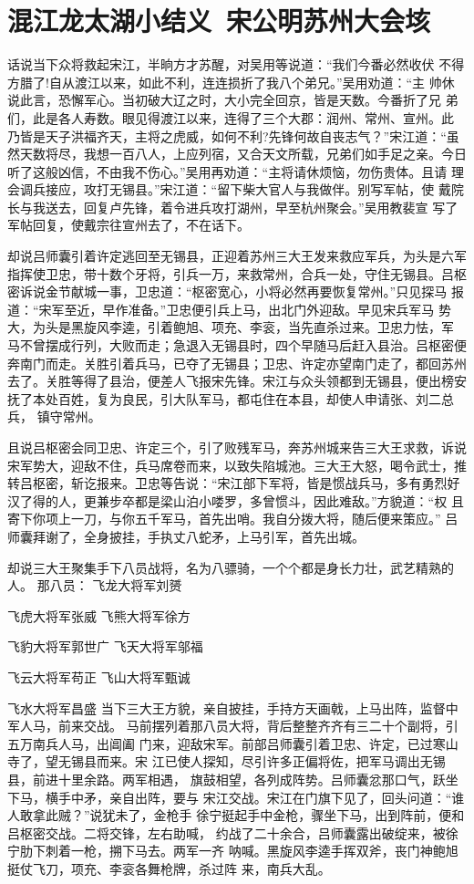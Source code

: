 \chapter{混江龙太湖小结义~宋公明苏州大会垓}

话说当下众将救起宋江，半晌方才苏醒，对吴用等说道：“我们今番必然收伏
不得方腊了!自从渡江以来，如此不利，连连损折了我八个弟兄。”吴用劝道：“主
帅休说此言，恐懈军心。当初破大辽之时，大小完全回京，皆是天数。今番折了兄
弟们，此是各人寿数。眼见得渡江以来，连得了三个大郡：润州、常州、宣州。此
乃皆是天子洪福齐天，主将之虎威，如何不利?先锋何故自丧志气？”宋江道：“虽
然天数将尽，我想一百八人，上应列宿，又合天文所载，兄弟们如手足之亲。今日
听了这般凶信，不由我不伤心。”吴用再劝道：“主将请休烦恼，勿伤贵体。且请
理会调兵接应，攻打无锡县。”宋江道：“留下柴大官人与我做伴。别写军帖，使
戴院长与我送去，回复卢先锋，着令进兵攻打湖州，早至杭州聚会。”吴用教裴宣
写了军帖回复，使戴宗往宣州去了，不在话下。

却说吕师囊引着许定逃回至无锡县，正迎着苏州三大王发来救应军兵，为头是六军
指挥使卫忠，带十数个牙将，引兵一万，来救常州，合兵一处，守住无锡县。吕枢
密诉说金节献城一事，卫忠道：“枢密宽心，小将必然再要恢复常州。”只见探马
报道：“宋军至近，早作准备。”卫忠便引兵上马，出北门外迎敌。早见宋兵军马
势大，为头是黑旋风李逵，引着鲍旭、项充、李衮，当先直杀过来。卫忠力怯，军
马不曾摆成行列，大败而走；急退入无锡县时，四个早随马后赶入县治。吕枢密便
奔南门而走。关胜引着兵马，已夺了无锡县；卫忠、许定亦望南门走了，都回苏州
去了。关胜等得了县治，便差人飞报宋先锋。宋江与众头领都到无锡县，便出榜安
抚了本处百姓，复为良民，引大队军马，都屯住在本县，却使人申请张、刘二总兵，
镇守常州。

且说吕枢密会同卫忠、许定三个，引了败残军马，奔苏州城来告三大王求救，诉说
宋军势大，迎敌不住，兵马席卷而来，以致失陷城池。三大王大怒，喝令武士，推
转吕枢密，斩讫报来。卫忠等告说：“宋江部下军将，皆是惯战兵马，多有勇烈好
汉了得的人，更兼步卒都是梁山泊小喽罗，多曾惯斗，因此难敌。”方貌道：“权
且寄下你项上一刀，与你五千军马，首先出哨。我自分拨大将，随后便来策应。”
吕师囊拜谢了，全身披挂，手执丈八蛇矛，上马引军，首先出城。

却说三大王聚集手下八员战将，名为八骠骑，一个个都是身长力壮，武艺精熟的人。
那八员：
飞龙大将军刘赟

飞虎大将军张威
飞熊大将军徐方

飞豹大将军郭世广
飞天大将军邬福

飞云大将军苟正
飞山大将军甄诚

飞水大将军昌盛
当下三大王方貌，亲自披挂，手持方天画戟，上马出阵，监督中军人马，前来交战。
马前摆列着那八员大将，背后整整齐齐有三二十个副将，引五万南兵人马，出阊阖
门来，迎敌宋军。前部吕师囊引着卫忠、许定，已过寒山寺了，望无锡县而来。宋
江已使人探知，尽引许多正偏将佐，把军马调出无锡县，前进十里余路。两军相遇，
旗鼓相望，各列成阵势。吕师囊忿那口气，跃坐下马，横手中矛，亲自出阵，要与
宋江交战。宋江在门旗下见了，回头问道：“谁人敢拿此贼？”说犹未了，金枪手
徐宁挺起手中金枪，骤坐下马，出到阵前，便和吕枢密交战。二将交锋，左右助喊，
约战了二十余合，吕师囊露出破绽来，被徐宁肋下刺着一枪，搠下马去。两军一齐
呐喊。黑旋风李逵手挥双斧，丧门神鲍旭挺仗飞刀，项充、李衮各舞枪牌，杀过阵
来，南兵大乱。

